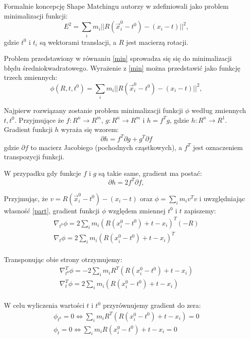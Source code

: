 Formalnie koncepcję Shape Matchingu autorzy w \cite{shape} zdefiniowali
jako problem minimalizacji funkcji:
\begin{equation}
E^2 = \sum_{i} m_i ||R (\vec{x}^0_i - t^0) - (x_i - t) ||^2,
\label{min}
\end{equation}
gdzie $t^0$ i $t_i$ są wektorami translacji, a $R$ jest macierzą
rotacji.

Problem przedstawiony w równaniu \ref{min} sprowadza się
się do minimalizacji błędu średniokwadratowego. Wyrażenie z \ref{min} można przedstawić
jako funkcję trzech zmiennych:
\begin{equation}
\phi(R, t, t^0) = \sum_{i} m_i ||R (\vec{x}^0_i - t^0) - (x_i - t) ||^2,
\end{equation}

Najpierw rozwiązany zostanie problem minimalizacji funkcji $\phi$ według zmiennych $t, t^0$.
Przyjmujące że $f: R^n \to R^m$, $g: R^n \to R^m$ i $h = f^T g$, gdzie $h: R^n
\to R^1$. Gradient funkcji $h$ wyraża się wzorem:
\begin{equation}
\partial h = f^T \partial g + g^T \partial f
\end{equation}
gdzie $\partial f$ to macierz Jacobiego (pochodnych cząstkowych), a $f^T$ jest
oznaczeniem transpozycji funkcji.

W przypadku gdy funkcje $f$ i $g$ są takie same, gradient ma postać:
\begin{equation}
\partial h = 2 f^T \partial f,
\label{part}
\end{equation}

Przyjmując, że $v = R (\vec{x}^0_i - t^0) - (x_i - t)$ oraz $\phi = \sum_i m_i
v^T v$ i uwzględniając własność \ref{part}, gradient funkcji $\phi$ względem
zmiennej $t^0$ i $t$ zapiszemy:
\begin{eqnarray}
\nabla_{t^0} \phi = 2 \sum_i m_i (R (x^0_i - t^0) + t - x_i)^T (-R)\\
\nabla_{t} \phi = 2 \sum_i m_i (R (x^0_i - t^0) + t - x_i)^T\\
\end{eqnarray}

Transponując obie strony otrzymujemy:
\begin{eqnarray}
\nabla_{t^0}^T \phi = -2 \sum_i m_i R^T (R (x^0_i - t^0) + t - x_i)\\
\nabla_{t}^T \phi = 2 \sum_i m_i (R (x^0_i - t^0) + t - x_i)\\
\end{eqnarray}

W celu wyliczenia wartości $t$ i $t^0$ przyrównujemy gradient do zera:
\begin{eqnarray}
\label{d1}
\phi_{t^0} = 0 \Leftrightarrow \sum_i m_i R^T (R (x^0_i - t^0) + t - x_i) = 0\\
\label{d2}
\phi_{t} = 0 \Leftrightarrow \sum_i m_i R (x^0_i - t^0) + t - x_i = 0\\
\end{eqnarray}

